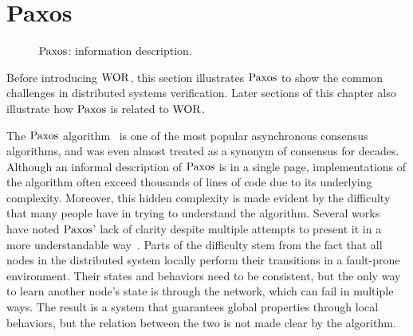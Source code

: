 \section{Paxos} 
\label{sec:paxos} 

\begin{figure}
\begin{minipage}{\linewidth}
\begin{multicols}{2}
  
\end{multicols}
\end{minipage}
\caption{$\mathrm{Paxos}$: information description.}
\label{fig:chapter:multipaxos:paxos-pseudocode}
\end{figure}

Before introducing $\mathrm{WOR}$,
this section illustrates $\mathrm{Paxos}$ to show the common challenges in distributed systems verification.
Later sections of this chapter also illustrate how $\mathrm{Paxos}$ is related to $\mathrm{WOR}$.

The $\mathrm{Paxos}$ algorithm~\cite{paxos}
is one of the most popular asynchronous consensus algorithms, and was even almost treated as a synonym of
consensus for decades.
Although an informal description of $\mathrm{Paxos}$ is in a single page,
implementations of the algorithm often exceed thousands of lines of code due to its underlying complexity.
Moreover, this hidden complexity is made evident by the difficulty that many people have in trying to understand the algorithm.
Several works~\cite{raft, rvrpaxos} have noted $\mathrm{Paxos}$' lack of clarity despite multiple attempts to present
it in a more understandable way~\cite{paxosmadesimple, Lampson1996, Lampson2001, dpaxos}.
Parts of the difficulty stem from the fact that all nodes in the distributed system locally perform their transitions in a fault-prone environment.
Their states and behaviors need to be consistent, but
the only way to learn another node's state is through the network, which can fail in multiple ways.
The result is a system that guarantees global properties through local behaviors, but the relation between the two is not made clear by the algorithm.

